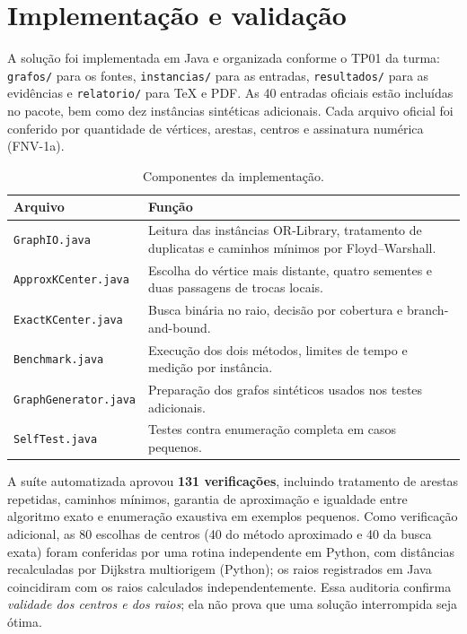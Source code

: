 \documentclass[12pt,a4paper]{article}
\begin{document}
\section{Implementação e validação}
A solução foi implementada em Java e organizada conforme o TP01 da turma:
\texttt{grafos/} para os fontes, \texttt{instancias/} para as entradas,
\texttt{resultados/} para as evidências e \texttt{relatorio/} para TeX e PDF.
As 40 entradas oficiais estão incluídas no pacote, bem como dez instâncias
sintéticas adicionais. Cada arquivo oficial foi conferido por quantidade de
vértices, arestas, centros e assinatura numérica (FNV-1a).

\begin{table}[H]\centering\small
\caption{Componentes da implementação.}
\begin{tabular}{@{}p{5cm}p{7.2cm}@{}}\toprule
Arquivo & Função \\ \midrule
\texttt{GraphIO.java} & Leitura das instâncias OR-Library, tratamento de duplicatas e caminhos mínimos por Floyd--Warshall.\\
\texttt{ApproxKCenter.java} & Escolha do vértice mais distante, quatro sementes e duas passagens de trocas locais.\\
\texttt{ExactKCenter.java} & Busca binária no raio, decisão por cobertura e branch-and-bound.\\
\texttt{Benchmark.java} & Execução dos dois métodos, limites de tempo e medição por instância.\\
\texttt{GraphGenerator.java} & Preparação dos grafos sintéticos usados nos testes adicionais.\\
\texttt{SelfTest.java} & Testes contra enumeração completa em casos pequenos.\\
\bottomrule\end{tabular}
\end{table}

A suíte automatizada aprovou \textbf{131 verificações}, incluindo tratamento de
arestas repetidas, caminhos mínimos, garantia de aproximação e igualdade
entre algoritmo exato e enumeração exaustiva em exemplos pequenos.
Como verificação adicional, as 80 escolhas de centros (40 do método aproximado
e 40 da busca exata) foram conferidas por uma rotina independente em Python,
com distâncias recalculadas por Dijkstra multiorigem (Python); os raios registrados em Java
coincidiram com os raios calculados independentemente. Essa auditoria confirma
\emph{validade dos centros e dos raios}; ela não prova que uma solução
interrompida seja ótima.
\end{document}
